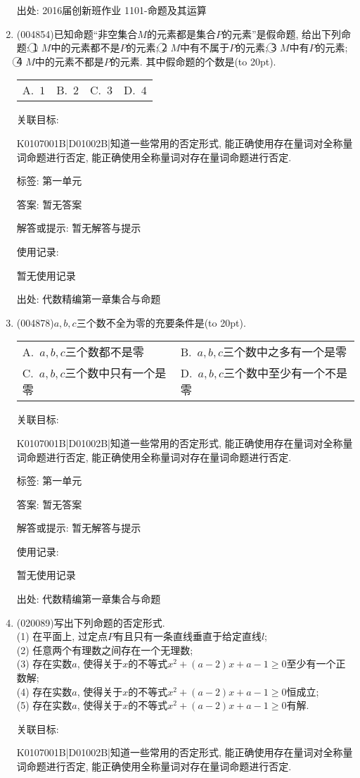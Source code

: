 \documentclass[10pt,a4paper]{article}
\newcommand{\bracket}[1]{(\hbox to #1pt{})}
\newcommand{\twoch}[4]{\par\begin{tabular}{p{.46\textwidth}p{.46\textwidth}}
A.~#1& B.~#2\\
C.~#3& D.~#4
\end{tabular}}
\newcommand{\fourch}[4]{\par\begin{tabular}{p{.23\textwidth}p{.23\textwidth}p{.23\textwidth}p{.23\textwidth}}
A.~#1 &B.~#2& C.~#3& D.~#4
\end{tabular}}
\begin{document}
\begin{enumerate}[1.]
出处: 2016届创新班作业	1101-命题及其运算
\item { (004854)}已知命题``非空集合$M$的元素都是集合$P$的元素''是假命题, 给出下列命题: \textcircled{1} $M$中的元素都不是$P$的元素; \textcircled{2} $M$中有不属于$P$的元素; \textcircled{3} $M$中有$P$的元素; \textcircled{4} $M$中的元素不都是$P$的元素. 其中假命题的个数是\bracket{20}.
\fourch{$1$}{$2$}{$3$}{$4$}


关联目标:

K0107001B|D01002B|知道一些常用的否定形式, 能正确使用存在量词对全称量词命题进行否定, 能正确使用全称量词对存在量词命题进行否定.



标签: 第一单元

答案: 暂无答案

解答或提示: 暂无解答与提示

使用记录:

暂无使用记录


出处: 代数精编第一章集合与命题
\item { (004878)}$a,b,c$三个数不全为零的充要条件是\bracket{20}.
\twoch{$a,b,c$三个数都不是零}{$a,b,c$三个数中之多有一个是零}{$a,b,c$三个数中只有一个是零}{$a,b,c$三个数中至少有一个不是零}


关联目标:

K0107001B|D01002B|知道一些常用的否定形式, 能正确使用存在量词对全称量词命题进行否定, 能正确使用全称量词对存在量词命题进行否定.



标签: 第一单元

答案: 暂无答案

解答或提示: 暂无解答与提示

使用记录:

暂无使用记录


出处: 代数精编第一章集合与命题
\item { (020089)}写出下列命题的否定形式.\\
(1) 在平面上, 过定点$P$有且只有一条直线垂直于给定直线$l$;\\
(2) 任意两个有理数之间存在一个无理数;\\
(3) 存在实数$a$, 使得关于$x$的不等式$x^2+(a-2)x+a-1\ge 0$至少有一个正数解;\\
(4) 存在实数$a$, 使得关于$x$的不等式$x^2+(a-2)x+a-1\ge 0$恒成立;\\
(5) 存在实数$a$, 使得关于$x$的不等式$x^2+(a-2)x+a-1\ge 0$有解.


关联目标:

K0107001B|D01002B|知道一些常用的否定形式, 能正确使用存在量词对全称量词命题进行否定, 能正确使用全称量词对存在量词命题进行否定.




\end{enumerate}
\end{document}
